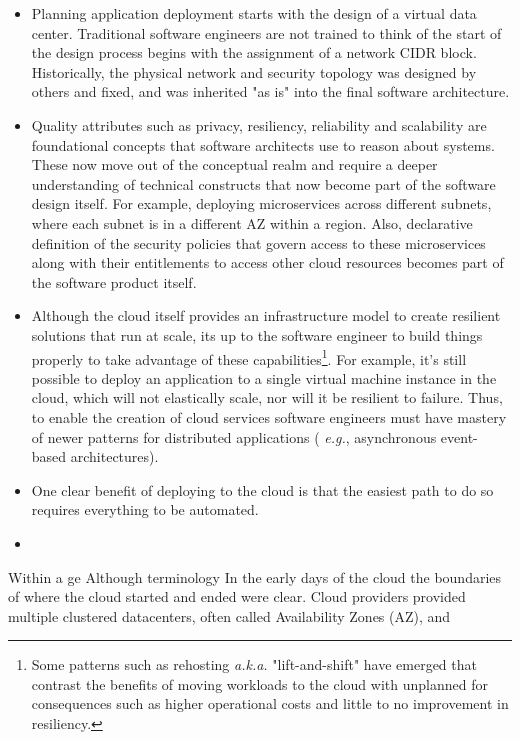 \documentclass[conference]{IEEEconf}
\begin{document}
\begin{itemize}
	\item Planning application deployment starts with the design of a virtual data center. Traditional software engineers are not trained to think of the start of the design process begins with the assignment of a network CIDR block. Historically, the physical network and security topology was designed by others and fixed, and was inherited "as is" into the final software architecture. 
	
	\item Quality attributes such as privacy, resiliency, reliability and scalability are foundational concepts that software architects use to reason about systems.  These now move out of the conceptual realm and require a deeper understanding of technical constructs that now become part of the software design itself.  For example, deploying microservices across different subnets, where each subnet is in a different AZ within a region. Also, declarative definition of  the security policies that govern access to these microservices along with their entitlements to access other cloud resources becomes part of the software product itself. 
	
	\item Although the cloud itself provides an infrastructure model to create resilient solutions that run at scale, its up to the software engineer to build things properly to take advantage of these capabilities\footnote{Some patterns such as rehosting\cite{engelsrud2019moving} {\em a.k.a.} "lift-and-shift" have emerged that contrast the benefits of moving workloads to the cloud with unplanned for consequences such as higher operational costs and little to no improvement in resiliency.}.  For example, it's still possible to deploy an application to a single virtual machine instance in the cloud, which will not elastically scale, nor will it be resilient to failure.  Thus, to enable the creation of cloud services software engineers must have mastery of newer patterns for distributed applications ( {\em e.g.}, asynchronous event-based architectures).
	
	\item One clear benefit of deploying to the cloud is that the easiest path to do so requires everything to be automated. 
	\item 
\end{itemize}


Within a ge
Although terminology In the early days of the cloud the boundaries of where the cloud started and ended were clear. Cloud providers provided multiple clustered datacenters, often called Availability Zones (AZ), and  
\end{document}

